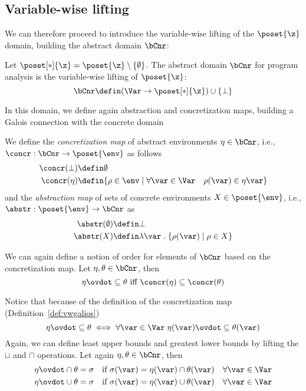 \subsection{Variable-wise lifting}\label{sub:vwnonrel}

We can therefore proceed to introduce the variable-wise lifting of the
\(\poset{\z}\) domain, building the abstract domain \(\bCnr\):

\begin{definition}
  Let \(\poset[*]{\z} = \poset{\z} \setminus \{\emptyset\}\). The
  abstract domain \(\bCnr\) for program analysis is the variable-wise
  lifting of \(\poset{\z}\):
  \[ \bCnr \defin (\Var \to \poset[*]{\z}) \cup \{ \bot \} \]
\end{definition}

In this domain, we define again abstraction and concretization maps,
building a Galois connection with the concrete domain

\begin{definition}\label{def:vwgalios}
  We define the \emph{concretization map} of abstract environments
  \(\eta \in \bCnr\), i.e., \({\concr : \bCnr \to \poset{\env}}\) as
  follows
  \begin{align*}
    \concr(\bot) & \defin \emptyset \\
    \concr(\eta) & \defin \{\rho \in \env \mid \forall \var \in \Var \quad \rho(\var) \in \eta\var\}
  \end{align*}
  and the \emph{abstraction map} of sets of concrete environments
  \(X \in \poset{\env}\), i.e., \(\abstr : \poset{\env} \to \bCnr\) as
  \begin{align*}
    \abstr(\emptyset) & \defin \bot \\
    \abstr(X) & \defin \lambda \var \; . \; \{\rho(\var) \mid \rho \in X\}
  \end{align*}
\end{definition}

We can again define a notion of order for elements of \(\bCnr\) based
on the concretization map. Let \(\eta, \theta \in \bCnr\), then
\begin{equation*}
  \eta \ovdot\subseteq \theta \text{ iff } \concr(\eta) \subseteq \concr(\theta)
\end{equation*}

Notice that because of the definition of the concretization map
(Definition~\ref{def:vwgalios})
\begin{equation*}
  \eta \ovdot\subseteq \theta \iff \forall \var \in \Var \; \eta(\var) \ovdot\subseteq \theta(\var)
\end{equation*}
Again, we can define least upper bounds and greatest lower bounds by
lifting the \(\sqcup\) and \(\sqcap\) operations. Let again
\(\eta, \theta \in \bCnr\), then
\begin{align*}
  \eta \ovdot\cap \theta = \sigma & \quad \text{if } \sigma(\var) = \eta(\var) \cap \theta(\var) \quad \forall \var\in\Var \\
  \eta \ovdot\cup \theta = \sigma & \quad \text{if } \sigma(\var) = \eta(\var) \cup \theta(\var) \quad \forall \var\in\Var
\end{align*}

